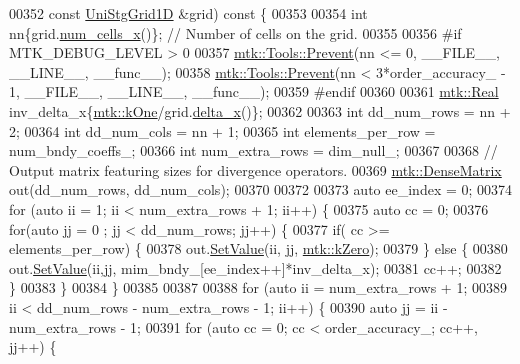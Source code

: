 \begin{DoxyCode}
{{00352   \textcolor{keyword}{const} \hyperlink{classmtk_1_1UniStgGrid1D}{UniStgGrid1D} &grid)\textcolor{keyword}{ const }\{
00353 
00354   \textcolor{keywordtype}{int} nn\{grid.\hyperlink{classmtk_1_1UniStgGrid1D_af1b3729d8afa07be5b2775ed68015b80}{num\_cells\_x}()\}; \textcolor{comment}{// Number of cells on the grid.}
00355 
00356 \textcolor{preprocessor}{  #if MTK\_DEBUG\_LEVEL > 0}
00357   \hyperlink{classmtk_1_1Tools_afe5bb096309258e2e72503fd7b41c7e0}{mtk::Tools::Prevent}(nn <= 0, \_\_FILE\_\_, \_\_LINE\_\_, \_\_func\_\_);
00358   \hyperlink{classmtk_1_1Tools_afe5bb096309258e2e72503fd7b41c7e0}{mtk::Tools::Prevent}(nn < 3*order\_accuracy\_ - 1, \_\_FILE\_\_, \_\_LINE\_\_, \_\_func\_\_);
00359 \textcolor{preprocessor}{  #endif}
00360 
00361   \hyperlink{group__c01-roots_gac080bbbf5cbb5502c9f00405f894857d}{mtk::Real} inv\_delta\_x\{\hyperlink{group__c01-roots_ga26407c24d43b6b95480943340d285c71}{mtk::kOne}/grid.\hyperlink{classmtk_1_1UniStgGrid1D_a6e7173b01241632cf509496d66b9f74c}{delta\_x}()\};
00362 
00363   \textcolor{keywordtype}{int} dd\_num\_rows = nn + 2;
00364   \textcolor{keywordtype}{int} dd\_num\_cols = nn + 1;
00365   \textcolor{keywordtype}{int} elements\_per\_row = num\_bndy\_coeffs\_;
00366   \textcolor{keywordtype}{int} num\_extra\_rows = dim\_null\_;
00367 
00368   \textcolor{comment}{// Output matrix featuring sizes for divergence operators.}
00369   \hyperlink{classmtk_1_1DenseMatrix}{mtk::DenseMatrix} out(dd\_num\_rows, dd\_num\_cols);
00370 
00372 
00373   \textcolor{keyword}{auto} ee\_index = 0;
00374   \textcolor{keywordflow}{for} (\textcolor{keyword}{auto} ii = 1; ii < num\_extra\_rows + 1; ii++) \{
00375     \textcolor{keyword}{auto} cc = 0;
00376     \textcolor{keywordflow}{for}(\textcolor{keyword}{auto} jj = 0 ; jj < dd\_num\_rows; jj++) \{
00377       \textcolor{keywordflow}{if}( cc >= elements\_per\_row) \{
00378         out.\hyperlink{classmtk_1_1DenseMatrix_ae0f873a6d3a734da467cafb817da64ae}{SetValue}(ii, jj, \hyperlink{group__c01-roots_ga59a451a5fae30d59649bcda274fea271}{mtk::kZero});
00379       \} \textcolor{keywordflow}{else} \{
00380         out.\hyperlink{classmtk_1_1DenseMatrix_ae0f873a6d3a734da467cafb817da64ae}{SetValue}(ii,jj, mim\_bndy\_[ee\_index++]*inv\_delta\_x);
00381         cc++;
00382       \}
00383     \}
00384   \}
00385 
00387 
00388   \textcolor{keywordflow}{for} (\textcolor{keyword}{auto} ii = num\_extra\_rows + 1;
00389        ii < dd\_num\_rows - num\_extra\_rows - 1; ii++) \{
00390     \textcolor{keyword}{auto} jj = ii - num\_extra\_rows - 1;
00391     \textcolor{keywordflow}{for} (\textcolor{keyword}{auto} cc = 0; cc < order\_accuracy\_; cc++, jj++) \{
}}
\end{DoxyCode}
